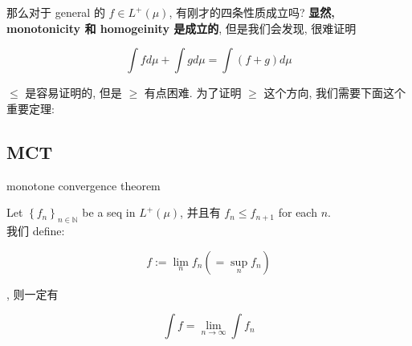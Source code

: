 \documentclass{qlnotes-export}
\begin{document}
那么对于 general 的 \(f \in L^{+}(\mu)\), 有刚才的四条性质成立吗? \textbf{显然, monotonicity 和 homogeinity 是成立的}, 但是我们会发现, 很难证明

\[\int f d\mu + \int g d\mu = \int(f + g) d\mu\]

\(\leq\) 是容易证明的, 但是 \(\geq\) 有点困难. 为了证明 \(\geq\) 这个方向, 我们需要下面这个重要定理:

\subsection{MCT}\label{mct}

\begin{theorem}{monotone convergence theorem}\label{thm-04-measurable-functions-and-integration-on-l-mu-monotone-convergence-theorem}

Let \(\left\{ f_{n} \right\}_{n \in {\mathbb{N}}}\) be a seq in \(L^{+}(\mu)\), 并且有 \(f_{n} \leq f_{n + 1}\) for each \(n\).\\
我们 define:

\[f := \lim\limits_{n}f_{n}( = \sup\limits_{n}f_{n})\]

, 则一定有

\[\int f = \lim\limits_{n\rightarrow\infty}\int f_{n}\]

\end{theorem}
\end{document}
